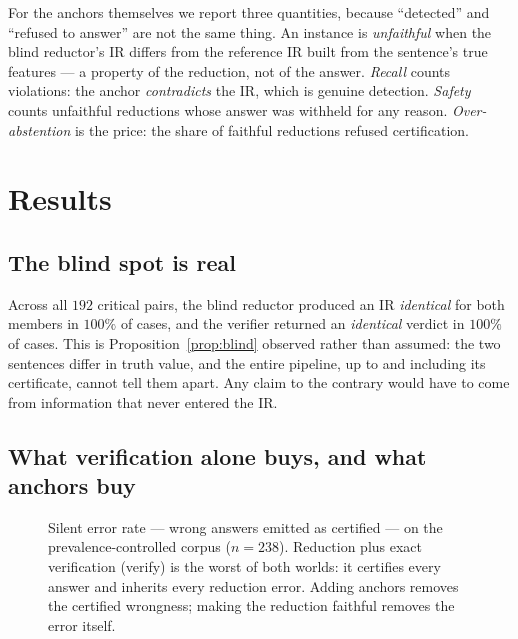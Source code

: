 \documentclass[11pt]{article}
\newcommand{\pVerify}{\textsf{verify}}
\theoremstyle{definition}
\begin{document}
For the anchors themselves we report three quantities, because ``detected'' and
``refused to answer'' are not the same thing. An instance is \emph{unfaithful}
when the blind reductor's IR differs from the reference IR built from the
sentence's true features --- a property of the reduction, not of the answer.
\emph{Recall} counts violations: the anchor \emph{contradicts} the IR, which is
genuine detection. \emph{Safety} counts unfaithful reductions whose answer was
withheld for any reason. \emph{Over-abstention} is the price: the share of
faithful reductions refused certification.

\section{Results}
\label{sec:results}

\subsection{The blind spot is real}
\label{sec:blindspot}

Across all $192$ critical pairs, the blind reductor produced an IR \emph{identical}
for both members in $100\%$ of cases, and the verifier returned an
\emph{identical} verdict in $100\%$ of cases. This is Proposition~\ref{prop:blind}
observed rather than assumed: the two sentences differ in truth value, and the
entire pipeline, up to and including its certificate, cannot tell them apart.
Any claim to the contrary would have to come from information that never entered
the IR.

\subsection{What verification alone buys, and what anchors buy}
\label{sec:pipelinesresults}

\begin{figure}[t]
  \centering
  
  \caption{Silent error rate --- wrong answers emitted as certified --- on the
  prevalence-controlled corpus ($n = 238$). Reduction plus exact verification
  (\pVerify) is the worst of both worlds: it certifies every answer and inherits
  every reduction error. Adding anchors removes the certified wrongness; making
  the reduction faithful removes the error itself.}
  \label{fig:silent}
\end{figure}


\end{document}

